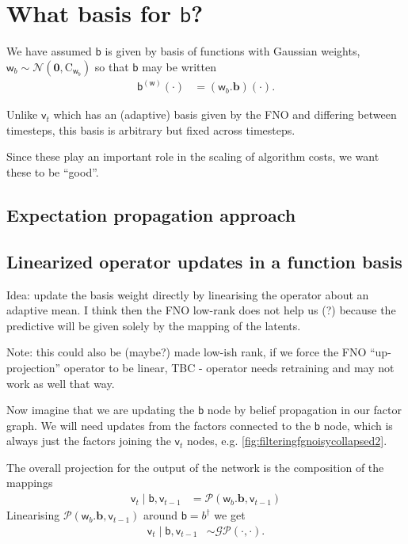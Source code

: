 \documentclass{article}
\newcommand{\vv}[1]{\boldsymbol{#1}}
\newcommand{\mm}[1]{\mathrm{#1}}
\newcommand{\rv}[1]{\mathsf{#1}}
\newcommand{\vrv}[1]{\vv{\rv{#1}}}
\newcommand{\dist}[1]{\mathcal{#1}}
\newcommand{\op}[1]{\mathscr{#1}}
\newcommand{\gvn}{\mid}
\newcommand{\lat}{\rv{b}}   %
\newcommand{\latst}{b}      %
\begin{document}
\section{What basis for \(\lat\)?}

We have assumed \(\lat\) is given by basis of functions with Gaussian weights,
\(\vrv{w}_{\latst} \sim \dist{N}\left(\vv{0}, \mm{C}_{\vrv{w}_{\latst}}\right)\) so that  \(\lat\) may be written
\begin{align*}
  \lat^{(\vrv{w})}(\cdot) &= (\vrv{w}_{\latst}.\vv{\latst})(\cdot).
\end{align*}

Unlike \(\rv{v}_{t}\) which has an (adaptive) basis given by the FNO and differing between timesteps, this basis is arbitrary but fixed across timesteps.

Since these play an important role in the scaling of algorithm costs, we want these to be ``good''.


\subsection{Expectation propagation approach}


\subsection{Linearized operator updates in a function basis}

Idea: update the basis weight directly by linearising the operator about an adaptive mean.
I think then the FNO low-rank does not help us (?) because the predictive will be given solely by the mapping of the latents.

Note: this could also be (maybe?) made low-ish rank, if we force the FNO ``up-projection'' operator to be linear,
TBC - operator needs retraining and may not work as well that way.

Now imagine that we are updating the \(\lat\) node by belief propagation in our factor graph.
We will need updates from the factors connected to the \(\lat\) node, which is always just the factors joining the \(\rv{v}_{t}\) nodes, e.g. \autoref{fig:filteringfgnoisycollapsed2}.

The overall projection for the output of the network is the composition of the mappings
\begin{align*}
\rv{v}_{t}\gvn \lat,\rv{v}_{t-1} 
&= \op{P}(\vrv{w}_{\latst}.\vv{\latst},\rv{v}_{t-1})
\end{align*}
Linearising \(\op{P}(\vrv{w}_{\latst}.\vv{\latst},\rv{v}_{t-1})\) around \(\lat=\latst^\dagger \) we get 
\begin{align*}
\rv{v}_{t}\gvn \lat,\rv{v}_{t-1} &\sim 
\dist{GP}\left(
  \cdot,
  \cdot
 \right).
\end{align*}
\end{document}

